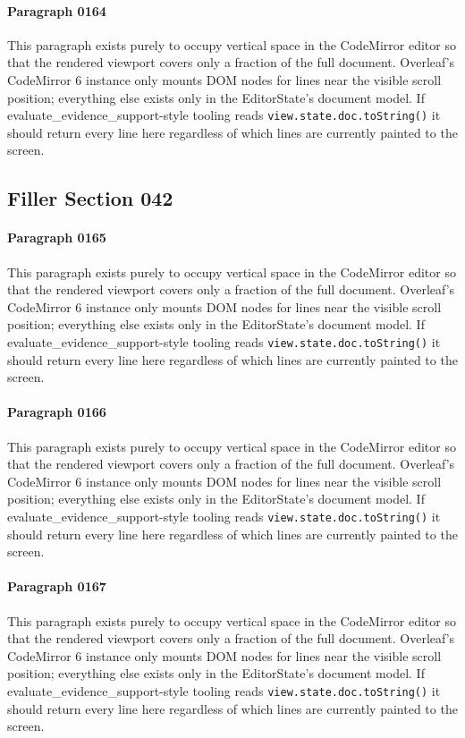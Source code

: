\documentclass{article}
\begin{document}
\paragraph{Paragraph 0164}
This paragraph exists purely to occupy vertical space in the CodeMirror editor so that the rendered viewport covers only a fraction of the full document. Overleaf's CodeMirror 6 instance only mounts DOM nodes for lines near the visible scroll position; everything else exists only in the EditorState's document model. If evaluate\_evidence\_support-style tooling reads \texttt{view.state.doc.toString()} it should return every line here regardless of which lines are currently painted to the screen.

\subsection{Filler Section 042}
\paragraph{Paragraph 0165}
This paragraph exists purely to occupy vertical space in the CodeMirror editor so that the rendered viewport covers only a fraction of the full document. Overleaf's CodeMirror 6 instance only mounts DOM nodes for lines near the visible scroll position; everything else exists only in the EditorState's document model. If evaluate\_evidence\_support-style tooling reads \texttt{view.state.doc.toString()} it should return every line here regardless of which lines are currently painted to the screen.

\paragraph{Paragraph 0166}
This paragraph exists purely to occupy vertical space in the CodeMirror editor so that the rendered viewport covers only a fraction of the full document. Overleaf's CodeMirror 6 instance only mounts DOM nodes for lines near the visible scroll position; everything else exists only in the EditorState's document model. If evaluate\_evidence\_support-style tooling reads \texttt{view.state.doc.toString()} it should return every line here regardless of which lines are currently painted to the screen.

\paragraph{Paragraph 0167}
This paragraph exists purely to occupy vertical space in the CodeMirror editor so that the rendered viewport covers only a fraction of the full document. Overleaf's CodeMirror 6 instance only mounts DOM nodes for lines near the visible scroll position; everything else exists only in the EditorState's document model. If evaluate\_evidence\_support-style tooling reads \texttt{view.state.doc.toString()} it should return every line here regardless of which lines are currently painted to the screen.
\end{document}
